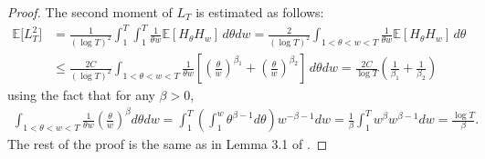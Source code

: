 \documentclass[12pt]{article}
\def\bE{\mathbb{E}}
\begin{document}
\begin{proof}
The second moment of $L_T$ is estimated as follows: 
\begin{align*}
\bE\big[ L_T^2 \big]
&= \frac{1}{(\log T)^2} \int_1^T \int_1^T \frac{1}{\theta w}  \bE[ H_\theta H_w ] \,d\theta dw =\frac{2}{(\log T)^2} \int_{1<\theta<w<T} \frac{1}{\theta w}  \bE[ H_\theta H_w ] \,d\theta \\
&\leq \frac{2C}{(\log T)^2} \int_{1<\theta<w<T}  \frac{1}{\theta w}
  \left[\left( \frac{\theta}{w} \right)^{\beta_1}+\left( \frac{\theta}{w} \right)^{\beta_2}\right] \,d\theta dw=\frac{2C}{\log T}\left( \frac{1}{\beta_1}+\frac{1}{\beta_2}\right)
 \end{align*}
using the fact that for any $\beta>0$,
\begin{align*}
\int_{1<\theta<w<T} \frac{1}{\theta w} \left( \frac{\theta}{w} \right)^{\beta} d\theta dw=\int_1^T \left(\int_1^w \theta^{\beta-1}d\theta \right)w^{-\beta-1}dw=\frac{1}{\beta}\int_1^T w^{\beta}w^{\beta-1}dw=\frac{\log T}{\beta}.
\end{align*}
The rest of the proof is the same as in Lemma 3.1 of \cite{BXZ}.

\end{proof}
\end{document}
